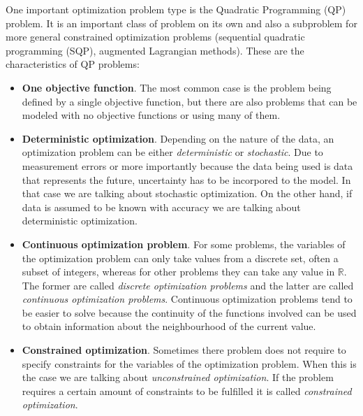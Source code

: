 One important optimization problem type is the Quadratic Programming (QP) problem. It is an important class of problem on its own and also a subproblem for more general constrained optimization problems (sequential quadratic programming (SQP), augmented Lagrangian methods). These are the characteristics of QP problems:

\begin{itemize}
    \item \textbf{One objective function}. The most common case is the problem being defined by a single objective function, but there are also problems that can be modeled with no objective functions or using many of them.
    \item \textbf{Deterministic optimization}. Depending on the nature of the data, an optimization problem can be either \textit{deterministic} or \textit{stochastic}. Due to measurement errors or more importantly because the data being used is data that represents the future, uncertainty has to be incorpored to the model. In that case we are talking about stochastic optimization. On the other hand, if data is assumed to be known with accuracy we are talking about deterministic optimization.
    \item \textbf{Continuous optimization problem}. For some problems, the variables of the optimization problem can only take values from a discrete set, often a subset of integers, whereas for other problems they can take any value in $\mathbb{R}$. The former are called \textit{discrete optimization problems} and the latter are called \textit{continuous optimization problems}. Continuous optimization problems tend to be easier to solve because the continuity of the functions involved can be used to obtain information about the neighbourhood of the current value.
    \item \textbf{Constrained optimization}. Sometimes there problem does not require to specify constraints for the variables of the optimization problem. When this is the case we are talking about \textit{unconstrained optimization}. If the problem requires a certain amount of constraints to be fulfilled it is called \textit{constrained optimization}.
\end{itemize}

